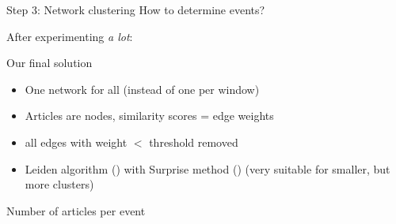 \begin{frame}{Step 3: Network clustering}
  How to determine events?

  After experimenting \emph{a lot}:
	
  \begin{block}{Our final solution}
    \begin{itemize}
    \item One network for all (instead of one per window)
    \item Articles are nodes, similarity scores = edge weights
    \item all edges with weight $<$ threshold removed
    \item Leiden algorithm (\cite{Traag2019}) with Surprise method (\cite{Traag2015}) (very suitable for smaller, but more clusters)
    \end{itemize}
  \end{block}
  
\end{frame}


\begin{frame}{Number of articles per event}
\begin{table}[h]
  \caption{Descriptives for different threshold/similarity combinations\label{tab:thresholds}}
  
  \centering
\end{table}
\end{frame}



